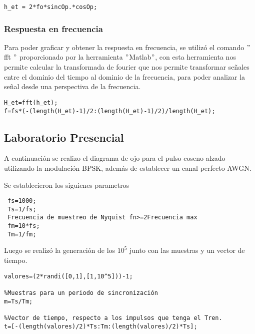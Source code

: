        
    \begin{lstlisting}[language=mat]
        h_et = 2*fo*sincOp.*cosOp;
    \end{lstlisting}
        
        \subsubsection{\textbf{Respuesta en frecuencia}}
        
        Para poder graficar y obtener la respuesta en frecuencia, se utilizó el comando $"$ fft $"$ proporcionado por la herramienta $"$Matlab$"$, con esta herramienta nos permite calcular la transformada de fourier  que nos permite transformar señales entre el dominio del tiempo al dominio de la frecuencia, para poder analizar la señal desde una perspectiva de la frecuencia.
        

\begin{lstlisting}[language=mat]
H_et=fft(h_et);
f=fs*(-(length(H_et)-1)/2:(length(H_et)-1)/2)/length(H_et);
\end{lstlisting}

    \subsection{\textbf{Laboratorio Presencial}}%
    
    A continuación se realizo el diagrama de ojo para el pulso coseno alzado utilizando la modulación BPSK, además de establecer un canal perfecto AWGN.
    
    Se establecieron los siguienes parametros 

 \begin{lstlisting}[language=mat]
 %Frecuencia y periodo de sincronizacion
 fs=1000;
 Ts=1/fs;
 Frecuencia de muestreo de Nyquist fn>=2Frecuencia max
 fm=10*fs;
 Tm=1/fm;
 \end{lstlisting}

        
    Luego se realizó la generación de los $10^{5}$ junto con las muestras y un vector de tiempo.
        
\begin{lstlisting}[language=mat]
%a_n, valores que tendrán los pulsos [-1,1] antípoda binaria
valores=(2*randi([0,1],[1,10^5]))-1;

%Muestras para un periodo de sincronización
m=Ts/Tm;

%Vector de tiempo, respecto a los impulsos que tenga el Tren.
t=[-(length(valores)/2)*Ts:Tm:(length(valores)/2)*Ts];
\end{lstlisting}

